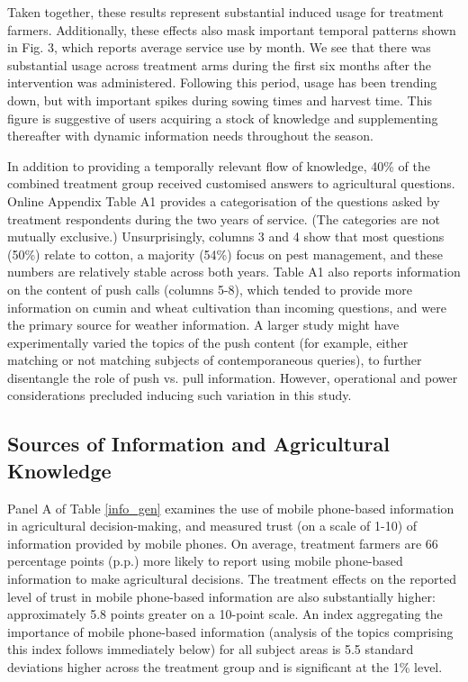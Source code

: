 \documentclass[12pt]{article}
\begin{document}
{\normalsize Taken together, these results represent substantial induced usage
for treatment farmers. Additionally, these effects also mask important
temporal patterns shown in Fig. 3, which reports average service use by
month. We see that there was substantial usage across treatment arms during
the first six months after the intervention was administered. Following this
period, usage has been trending down, but with important spikes during
sowing times and harvest time. This figure is suggestive of users
acquiring a stock of knowledge and supplementing thereafter with dynamic
information needs throughout the season. }

{\normalsize In addition to providing a temporally relevant flow of
knowledge, 40\% of the combined treatment group received
customised answers to agricultural questions. Online Appendix Table A1 provides a
categorisation of the questions asked by treatment respondents during the
two years of service. (The categories are not mutually exclusive.)
Unsurprisingly, columns 3 and 4 show that most questions (50\%) relate to
cotton, a majority (54\%) focus on pest management, and these numbers are
relatively stable across both years. Table A1 also reports information on
the content of push calls (columns 5-8), which tended to provide more
information on cumin and wheat cultivation than incoming questions, and were
the primary source for weather information. A larger study might have
experimentally varied the topics of the push content (for example, either
matching or not matching subjects of contemporaneous queries), to further
disentangle the role of push vs. pull information. However, operational and
power considerations precluded inducing such variation in this study.}

\subsection{\protect\normalsize Sources of Information and Agricultural Knowledge}

{\normalsize Panel A of Table \ref*{info_gen} examines the use of mobile
phone-based information in agricultural decision-making, and measured trust
(on a scale of 1-10) of information provided by mobile phones. On average, 
treatment farmers are 66 percentage points (p.p.) more likely to
report using mobile phone-based information to make agricultural decisions.
The treatment effects on the reported level of trust in mobile phone-based
information are also substantially higher: approximately 5.8 points
greater on a 10-point scale. An index aggregating the importance of mobile
phone-based information (analysis of the topics comprising this index
follows immediately below) for all subject areas is 5.5 standard
deviations higher across the treatment group and is significant at the 1\% level. }
\end{document}
